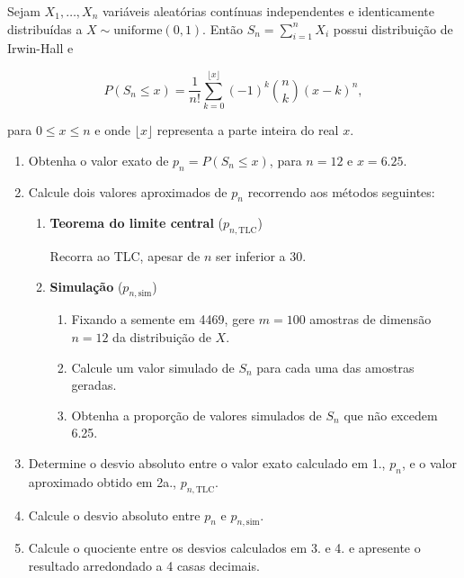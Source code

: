 \documentclass[11pt,a4paper]{article}
\begin{document}
\begin{tcolorbox}[colback=blue!5!white,colframe=blue!75!black,title=Distribuição de Irwin-Hall - Exercício 6]

Sejam \( X_1, \ldots, X_n \) variáveis aleatórias contínuas independentes e identicamente distribuídas a \( X \sim \text{uniforme}(0, 1) \). Então \( S_n = \sum_{i=1}^n X_i \) possui distribuição de Irwin-Hall e

\[
P(S_n \leq x) = \frac{1}{n!} \sum_{k=0}^{\lfloor x \rfloor} (-1)^k \binom{n}{k} (x - k)^n,
\]

para \( 0 \leq x \leq n \) e onde \(\lfloor x \rfloor\) representa a parte inteira do real \( x \).

\begin{enumerate}
    \item Obtenha o valor exato de \( p_n = P(S_n \leq x) \), para \( n = 12 \) e \( x = 6.25 \).
    
    \item Calcule dois valores aproximados de \( p_n \) recorrendo aos métodos seguintes:
    
    \begin{enumerate}
        \item \textbf{Teorema do limite central} (\( p_{n, \text{TLC}} \))
        
        Recorra ao TLC, apesar de \( n \) ser inferior a 30.
        
        \item \textbf{Simulação} (\( p_{n, \text{sim}} \))
        
        \begin{enumerate}
            \item Fixando a semente em 4469, gere \( m = 100 \) amostras de dimensão \( n = 12 \) da distribuição de \( X \).
            
            \item Calcule um valor simulado de \( S_n \) para cada uma das amostras geradas.
            
            \item Obtenha a proporção de valores simulados de \( S_n \) que não excedem 6.25.
        \end{enumerate}
    \end{enumerate}
    
    \item Determine o desvio absoluto entre o valor exato calculado em 1., \( p_n \), e o valor aproximado obtido em 2a., \( p_{n, \text{TLC}} \).
    
    \item Calcule o desvio absoluto entre \( p_n \) e \( p_{n, \text{sim}} \).
    
    \item Calcule o quociente entre os desvios calculados em 3. e 4. e apresente o resultado arredondado a 4 casas decimais.
\end{enumerate}

\end{tcolorbox}
\end{document}
